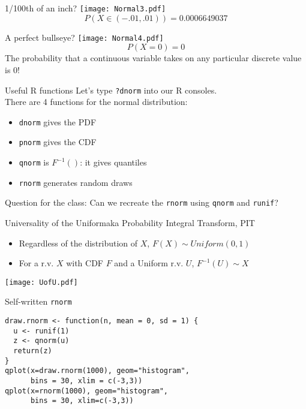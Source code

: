 \documentclass{beamer}
\begin{document}
\begin{frame}{1/100th of an inch?}
\centering\texttt{[image: Normal3.pdf]}
\pause
$$P(X\in(-.01, .01))=0.0006649037$$
\end{frame}


\begin{frame}{A perfect bullseye?}
\centering\texttt{[image: Normal4.pdf]}
\pause
$$P(X=0)=0$$
The probability that a continuous variable takes on any particular discrete value is \alert{0}!
\end{frame}

\begin{frame}{Useful R functions}
Let's type \texttt{?dnorm} into our R consoles. \pause \\
There are 4 functions for the normal distribution:
\begin{itemize}
\item \texttt{dnorm} gives the PDF
\item \texttt{pnorm} gives the CDF
\item \texttt{qnorm} is $F^{-1}()$: it gives quantiles
\item \texttt{rnorm} generates random draws
\end{itemize}
Question for the class: Can we recreate the \texttt{rnorm} using \texttt{qnorm} and \texttt{runif}?
\end{frame}

\begin{frame}{Universality of the Uniform}{aka Probability Integral Transform, PIT}
\begin{theorem}
\begin{footnotesize}
\begin{itemize}
\item Regardless of the distribution of $X$, $F(X)\sim Uniform(0,1)$
\item For a r.v. $X$ with CDF $F$ and a Uniform r.v. $U$, $F^{-1}(U)\sim X$
\end{itemize}
\end{footnotesize}
\end{theorem}
\begin{center}
\texttt{[image: UofU.pdf]}
\end{center}
\end{frame}


\begin{frame}[fragile]{Self-written \texttt{rnorm}}

\begin{verbatim}
draw.rnorm <- function(n, mean = 0, sd = 1) {
  u <- runif(1)
  z <- qnorm(u)
  return(z)
}
qplot(x=draw.rnorm(1000), geom="histogram",
      bins = 30, xlim = c(-3,3))
qplot(x=rnorm(1000), geom="histogram",
      bins = 30, xlim=c(-3,3))
\end{verbatim}
\end{frame}
\end{document}
